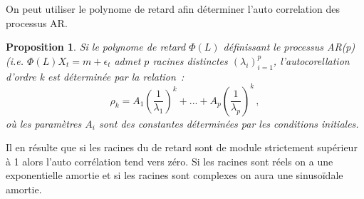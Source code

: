 \documentclass[11pt]{scrartcl} %
\newtheorem{pro}[theorem]{Proposition}
\begin{document}
On peut utiliser le polynome de retard afin déterminer l'auto correlation des processus AR.
\begin{pro}
Si le polynome de retard $\Phi(L)$ définissant le processus AR(p) (i.e. $\Phi(L)X_t=m+\epsilon_t$ admet $p$ racines distinctes $(\lambda_i)^p_{i=1}$, l'autocorellation d'ordre k est déterminée par la relation~:
$$
\rho_k = A_1\left(\frac{1}{\lambda_1}\right)^k+...+A_p\left(\frac{1}{\lambda_p}\right)^k\,,
$$
où les paramètres $A_i$ sont des constantes déterminées par les conditions initiales.
\end{pro}
Il en résulte que si les racines du  de retard sont de module strictement supérieur à 1 alors l'auto corrélation tend vers zéro. Si les racines sont réels on a une exponentielle amortie et si les racines sont complexes on aura une sinusoïdale amortie.
\end{document}
